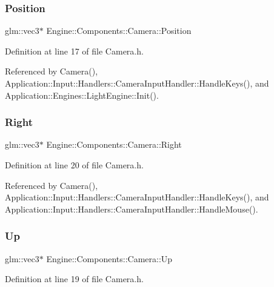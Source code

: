 \subsubsection{\texorpdfstring{Position}{Position}}
{\footnotesize\ttfamily glm\+::vec3$\ast$ Engine\+::\+Components\+::\+Camera\+::\+Position}



Definition at line 17 of file Camera.\+h.



Referenced by Camera(), Application\+::\+Input\+::\+Handlers\+::\+Camera\+Input\+Handler\+::\+Handle\+Keys(), and Application\+::\+Engines\+::\+Light\+Engine\+::\+Init().

\mbox{\label{classEngine_1_1Components_1_1Camera_a10b30289c89694d13918a979bade13d9}} 
\subsubsection{\texorpdfstring{Right}{Right}}
{\footnotesize\ttfamily glm\+::vec3$\ast$ Engine\+::\+Components\+::\+Camera\+::\+Right}



Definition at line 20 of file Camera.\+h.



Referenced by Camera(), Application\+::\+Input\+::\+Handlers\+::\+Camera\+Input\+Handler\+::\+Handle\+Keys(), and Application\+::\+Input\+::\+Handlers\+::\+Camera\+Input\+Handler\+::\+Handle\+Mouse().

\mbox{\label{classEngine_1_1Components_1_1Camera_a84a4199b9c60579a0f148b9980e05200}} 
\subsubsection{\texorpdfstring{Up}{Up}}
{\footnotesize\ttfamily glm\+::vec3$\ast$ Engine\+::\+Components\+::\+Camera\+::\+Up}



Definition at line 19 of file Camera.\+h.



